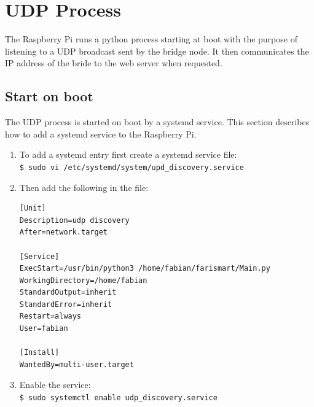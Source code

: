 \section{UDP Process}
The Raspberry Pi runs a python process starting at boot with
the purpose of listening to a UDP broadcast sent by the bridge
node. It then communicates the IP address of the bride to the
web server when requested.

    \subsection{Start on boot}
    The UDP process is started on boot by a systemd service.
    This section describes how to add a systemd service to the
    Raspberry Pi.

    \begin{enumerate}
        \item To add a systemd entry first create a systemd service file: \\
        \texttt{\$ sudo vi /etc/systemd/system/upd\_discovery.service}

        \item Then add the following in the file:
        \begin{verbatim}
[Unit]
Description=udp discovery
After=network.target

[Service]
ExecStart=/usr/bin/python3 /home/fabian/farismart/Main.py
WorkingDirectory=/home/fabian
StandardOutput=inherit
StandardError=inherit
Restart=always
User=fabian

[Install]
WantedBy=multi-user.target
        \end{verbatim}
        \item Enable the service: \\
        \texttt{\$ sudo systemctl enable udp\_discovery.service}
    \end{enumerate}
    